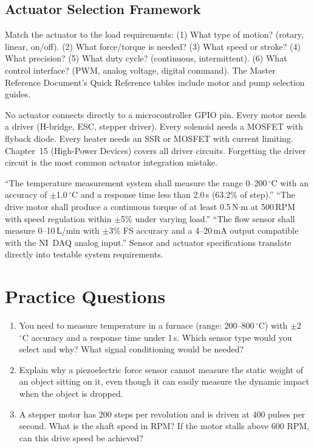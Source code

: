 \documentclass[11pt,letterpaper,twoside,openany]{book}
\newcommand{\degC}{\ensuremath{{}^{\circ}\text{C}}}
\begin{document}
\subsection{Actuator Selection Framework}
Match the actuator to the load requirements: (1) What type of motion? (rotary, linear, on/off). (2) What force/torque is needed? (3) What speed or stroke? (4) What precision? (5) What duty cycle? (continuous, intermittent). (6) What control interface? (PWM, analog voltage, digital command). The Master Reference Document's Quick Reference tables include motor and pump selection guides.

\begin{warningbox}
No actuator connects directly to a microcontroller GPIO pin. Every motor needs a driver (H-bridge, ESC, stepper driver). Every solenoid needs a MOSFET with flyback diode. Every heater needs an SSR or MOSFET with current limiting. Chapter~15 (High-Power Devices) covers all driver circuits. Forgetting the driver circuit is the most common actuator integration mistake.
\end{warningbox}

\begin{keyconceptbox}
``The temperature measurement system shall measure the range 0--200\,\degC{} with an accuracy of $\pm$1.0\,\degC{} and a response time less than 2.0\,s (63.2\% of step).'' ``The drive motor shall produce a continuous torque of at least 0.5\,N$\cdot$m at 500\,RPM with speed regulation within $\pm$5\% under varying load.'' ``The flow sensor shall measure 0--10\,L/min with $\pm$3\% FS accuracy and a 4--20\,mA output compatible with the NI~DAQ analog input.'' Sensor and actuator specifications translate directly into testable system requirements.
\end{keyconceptbox}

\section{Practice Questions}
\begin{enumerate}[leftmargin=1.5em]
\item You need to measure temperature in a furnace (range: 200--800\,\degC{}) with $\pm$2\,\degC{} accuracy and a response time under 1\,s. Which sensor type would you select and why? What signal conditioning would be needed?
\item Explain why a piezoelectric force sensor cannot measure the static weight of an object sitting on it, even though it can easily measure the dynamic impact when the object is dropped.
\item A stepper motor has 200 steps per revolution and is driven at 400 pulses per second. What is the shaft speed in RPM? If the motor stalls above 600 RPM, can this drive speed be achieved?
\end{enumerate}
\end{document}
